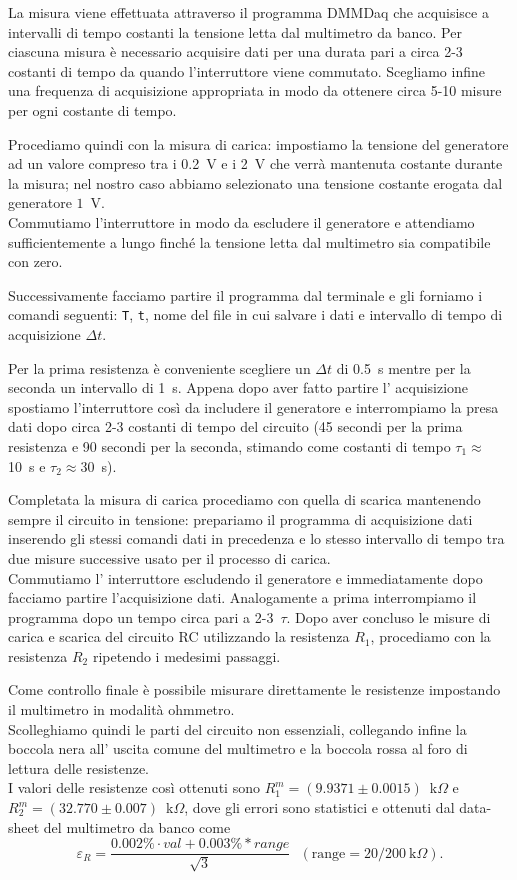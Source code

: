 \documentclass[italian, a4paper, 10pt, twocolumn]{../../style/lab_unige}
\newcommand{\mstdErr}[1]{\varepsilon_{#1}}
\begin{document}
    La misura viene effettuata attraverso il programma DMMDaq che acquisisce a intervalli di tempo costanti la tensione letta dal multimetro da banco. Per ciascuna misura è necessario acquisire dati per una durata pari a circa 2-3 costanti di tempo da quando l’interruttore viene commutato.  Scegliamo infine una frequenza di acquisizione appropriata in modo da ottenere circa 5-10 misure per ogni costante di tempo. 

    Procediamo quindi con la misura di carica: impostiamo la tensione del generatore ad un valore compreso tra i 0.2~V e i 2~V che verrà mantenuta costante durante la misura; nel nostro caso abbiamo selezionato una tensione costante erogata dal generatore $1$~V.\\
    Commutiamo l’interruttore in modo da escludere il generatore e attendiamo sufficientemente a lungo finché la tensione letta dal multimetro  sia compatibile con zero. 

    Successivamente facciamo partire il programma dal terminale e gli forniamo i comandi seguenti: \verb|T|, \verb|t|, nome del file in cui salvare i dati e intervallo di tempo di acquisizione $\Delta t$. 

    Per la prima resistenza è conveniente scegliere un $\Delta t$ di 0.5~s mentre per la seconda un intervallo di 1~s. Appena dopo aver fatto partire l’ acquisizione spostiamo l'interruttore così da includere il generatore e interrompiamo la presa dati dopo circa 2-3 costanti di tempo del circuito (45 secondi per la prima resistenza e 90 secondi per la seconda, stimando come costanti di tempo $\tau_1\approx$10~s e $\tau_2\approx$30~s).

    Completata la misura di carica procediamo con quella di scarica mantenendo sempre il circuito in tensione:  prepariamo il programma di acquisizione dati inserendo gli stessi comandi dati in precedenza e lo stesso intervallo di tempo tra due misure successive usato per il processo di carica. \\
    Commutiamo l’ interruttore escludendo il generatore e immediatamente dopo facciamo partire  l’acquisizione dati. Analogamente a prima interrompiamo il programma dopo un tempo circa pari a 2-3~$\tau$.
    Dopo aver concluso le misure di carica e scarica del circuito RC utilizzando la resistenza $R_1$, procediamo con la resistenza $R_2$ ripetendo i medesimi passaggi.

    Come controllo finale è possibile misurare direttamente le resistenze impostando il multimetro in modalità ohmmetro. \\
    Scolleghiamo quindi le parti del circuito non essenziali, collegando infine la boccola nera all’ uscita comune del multimetro e la boccola rossa al foro di lettura delle resistenze. \\
    I valori delle resistenze così ottenuti sono $R_1^m=(9.9371\pm0.0015)$~k$\Omega$ e $R_2^m=(32.770\pm0.007)$~k$\Omega$, dove gli errori sono statistici e ottenuti dal data-sheet del multimetro da banco come
    \[\mstdErr{R}=\frac{0.002\% \cdot val + 0.003\% * range}{\sqrt{3}}~~~(\text{range}=20/200~\text{k}\Omega).\]
\end{document}
